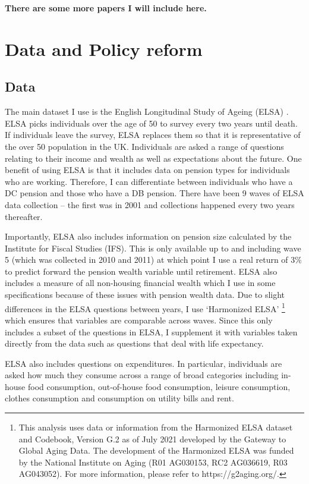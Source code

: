 \documentclass[12pt]{article}
\begin{document}
\textbf{There are some more papers I will include here.}

\section{Data and Policy reform}

\subsection{Data}

The main dataset I use is the English Longitudinal Study of Ageing (ELSA)
\cite{main_elsa_citation}. ELSA picks individuals over the age of 50 to survey
every two years until death. If individuals leave the survey, ELSA replaces them
so that it is representative of the over 50 population in the UK. Individuals
are asked a range of questions relating to their income and wealth as well as
expectations about the future. One benefit of using ELSA is that it includes
data on pension types for individuals who are working. Therefore, I can
differentiate between individuals who have a DC pension and those who have a DB
pension. There have been 9 waves of ELSA data collection -- the first was in
2001 and collections happened every two years thereafter.

Importantly, ELSA also includes information on pension size calculated by the
Institute for Fiscal Studies (IFS). This is only available up to and including
wave 5 (which was collected in 2010 and 2011) at which point I use a real return
of 3\% to predict forward the pension wealth variable until retirement. ELSA
also includes a measure of all non-housing financial wealth which I use in some
specifications because of these issues with pension wealth data. Due to slight
differences in the ELSA questions between years, I use `Harmonized ELSA'
\footnote{This analysis uses data or information from the Harmonized ELSA
    dataset and Codebook, Version G.2 as of July 2021 developed by the Gateway to
    Global Aging Data. The development of the Harmonized ELSA was funded by the
    National Institute on Aging (R01 AG030153, RC2 AG036619, R03 AG043052). For more
    information, please refer to https://g2aging.org/.} which ensures that variables
are comparable across waves. Since this only includes a subset of the questions
in ELSA, I supplement it with variables taken directly from the data such as
questions that deal with life expectancy.

ELSA also includes questions on expenditures. In particular, individuals are
asked how much they consume across a range of broad categories including
in-house food consumption, out-of-house food consumption, leisure consumption,
clothes consumption and consumption on utility bills and rent.
\end{document}
